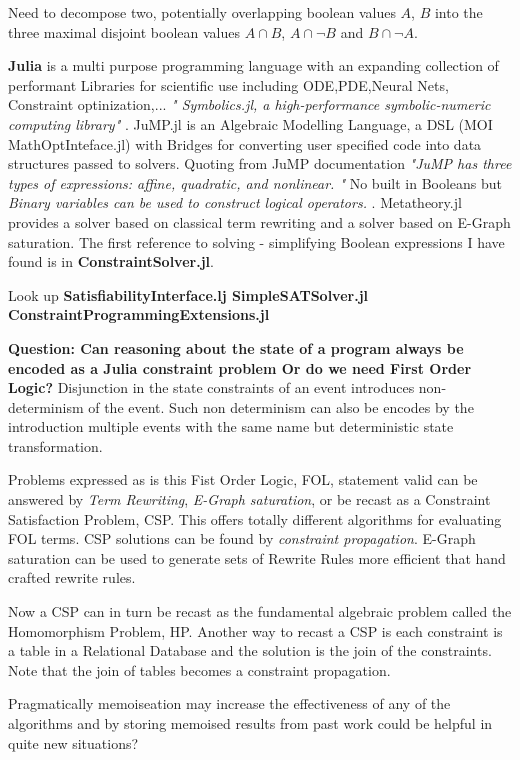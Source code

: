Need to decompose two, potentially overlapping  boolean values $A$, $B$ into the three maximal disjoint boolean values $A\cap B$, $A\cap \neg B$ and $B\cap \neg A$.

{\bf Julia} is a multi purpose programming language with an expanding collection of  performant  Libraries for scientific use including ODE,PDE,Neural Nets, Constraint optinization,... \emph{" Symbolics.jl, a high-performance symbolic-numeric computing library"} . JuMP.jl is an Algebraic Modelling Language, a DSL (MOI MathOptInteface.jl) with Bridges for converting user specified code into data structures passed to solvers.  Quoting from JuMP documentation \emph{"JuMP has three types of expressions: affine, quadratic, and nonlinear. "}  No built in Booleans but \emph{Binary variables can be used to construct logical operators.} . Metatheory.jl provides a solver based on classical term rewriting and a solver based on E-Graph saturation. The first reference to solving - simplifying Boolean expressions I have found is in {\bf ConstraintSolver.jl}.

Look up {\bf SatisfiabilityInterface.lj   SimpleSATSolver.jl  ConstraintProgrammingExtensions.jl}


{\bf Question: Can reasoning about the state of a program always be encoded as a Julia constraint problem Or do we need First Order Logic?}   Disjunction in the state constraints of an event introduces non-determinism of the event. Such non determinism can also be encodes by the introduction  multiple events with the same name but deterministic  state transformation.

Problems expressed as is this Fist Order Logic, FOL, statement valid can be answered by \emph{Term Rewriting}, \emph{E-Graph saturation}, or be recast as a Constraint Satisfaction Problem, CSP. This offers totally different algorithms for evaluating  FOL terms. CSP solutions can be found by \emph{constraint propagation}. 
E-Graph saturation can be used to generate sets of Rewrite Rules more efficient that hand crafted rewrite rules.

Now a CSP can in turn be recast as the fundamental algebraic problem called the Homomorphism Problem, HP. Another way to recast a CSP is each constraint is a table in a Relational Database and the solution is the join of the constraints. Note that the join of tables becomes a constraint propagation.

Pragmatically memoiseation may increase the effectiveness of any of the algorithms and by storing memoised results from past work could be helpful in quite new situations?

